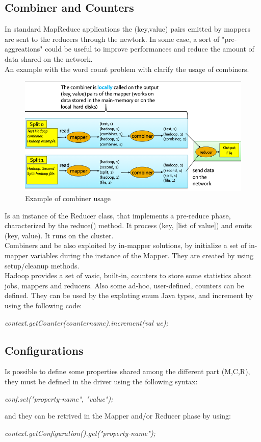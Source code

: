 \documentclass[12pt]{article}
\begin{document}
\subsection{Combiner and Counters}
In standard MapReduce applications the (key,value) pairs emitted by mappers are sent to the reducers through the newtork. In some case, a sort of "pre-aggreations" could be useful to improve performances and reduce the amount of data shared on the network.\\
An example with the word count problem with clarify the usage of combiners.
\begin{figure}[H]
  \includegraphics[width=\linewidth]{images/combiners.png}
  \caption{Example of combiner usage}
  \label{fig:cobiners}
\end{figure}
Is an instance of the Reducer class, that implements a pre-reduce phase, characterized by the reduce() method. It process (key, [list of value]) and emits (key, value). It runs on the cluster.\\
Combiners and be also exploited by in-mapper solutions, by initialize a set of in-mapper variables during the instance of the Mapper. They are created by using setup/cleanup methods.\\
Hadoop provides a set of vasic, built-in, counters to store some statistics about jobs, mappers and reducers. Also some ad-hoc, user-defined, counters can be defined. They can be used by the exploting enum Java types, and increment by using the following code:
\begin{center}
  \textit{context.getCounter(countername).increment(val ue);}
\end{center}

\subsection{Configurations}
Is possible to define some properties shared among the different part (M,C,R), they must be defined in the driver using the following syntax:
\begin{center}
  \textit{conf.set("property-name", "value");}
\end{center}
and they can be retrived in the Mapper and/or Reducer phase by using:
\begin{center}
  \textit{context.getConfiguration().get("property-name");}
\end{center}
\end{document}
